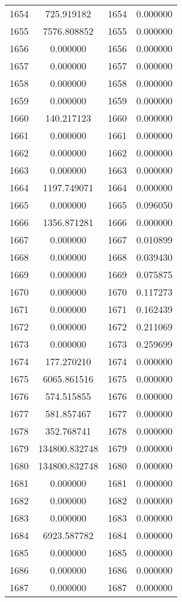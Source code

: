 \documentclass[12pt]{article}
\begin{document}
\begin{longtable}{@{}cccc@{}}
1654 & 725.919182 & 1654 & 0.000000 \\
1655 & 7576.808852 & 1655 & 0.000000 \\
1656 & 0.000000 & 1656 & 0.000000 \\
1657 & 0.000000 & 1657 & 0.000000 \\
1658 & 0.000000 & 1658 & 0.000000 \\
1659 & 0.000000 & 1659 & 0.000000 \\
1660 & 140.217123 & 1660 & 0.000000 \\
1661 & 0.000000 & 1661 & 0.000000 \\
1662 & 0.000000 & 1662 & 0.000000 \\
1663 & 0.000000 & 1663 & 0.000000 \\
1664 & 1197.749071 & 1664 & 0.000000 \\
1665 & 0.000000 & 1665 & 0.096050 \\
1666 & 1356.871281 & 1666 & 0.000000 \\
1667 & 0.000000 & 1667 & 0.010899 \\
1668 & 0.000000 & 1668 & 0.039430 \\
1669 & 0.000000 & 1669 & 0.075875 \\
1670 & 0.000000 & 1670 & 0.117273 \\
1671 & 0.000000 & 1671 & 0.162439 \\
1672 & 0.000000 & 1672 & 0.211069 \\
1673 & 0.000000 & 1673 & 0.259699 \\
1674 & 177.270210 & 1674 & 0.000000 \\
1675 & 6065.861516 & 1675 & 0.000000 \\
1676 & 574.515855 & 1676 & 0.000000 \\
1677 & 581.857467 & 1677 & 0.000000 \\
1678 & 352.768741 & 1678 & 0.000000 \\
1679 & 134800.832748 & 1679 & 0.000000 \\
1680 & 134800.832748 & 1680 & 0.000000 \\
1681 & 0.000000 & 1681 & 0.000000 \\
1682 & 0.000000 & 1682 & 0.000000 \\
1683 & 0.000000 & 1683 & 0.000000 \\
1684 & 6923.587782 & 1684 & 0.000000 \\
1685 & 0.000000 & 1685 & 0.000000 \\
1686 & 0.000000 & 1686 & 0.000000 \\
1687 & 0.000000 & 1687 & 0.000000 \\

\end{longtable}
\end{document}
